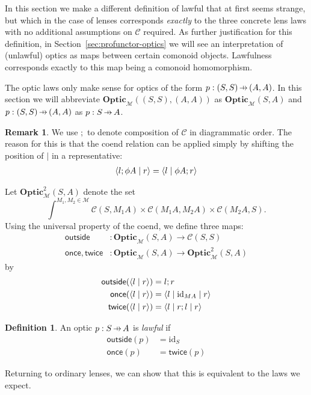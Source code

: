\documentclass[11pt,letterpaper]{article}
\theoremstyle{plain}
\theoremstyle{definition}
\newtheorem{definition}[theorem]{Definition}
\newtheorem{remark}[theorem]{Remark}
\newcommand{\C}{\mathscr{C}}
\newcommand{\M}{\mathscr{M}}
\newcommand{\Optic}{\mathbf{Optic}}
\newcommand{\Twoptic}{\mathbf{Optic}^2}
\newcommand{\id}{\mathrm{id}}
\newcommand{\rep}[2]{{\ensuremath \left\langle #1 \mid #2 \right\rangle}}
\newcommand{\repthree}[3]{{\ensuremath \langle #1 \mid #2 \mid #3 \rangle}}
\newcommand{\outside}{\mathsf{outside}}
\newcommand{\once}{\mathsf{once}}
\newcommand{\twice}{\mathsf{twice}}
\newcommand{\hto}{\ensuremath{\,\mathaccent\shortmid\rightarrow\,}}
\newcommand{\todo}[1]{\textcolor{red}{\small #1}}
\begin{document}
In this section we make a different definition of lawful that at first seems strange, but which in the case of lenses corresponds \emph{exactly} to the three concrete lens laws with no additional assumptions on $\C$ required. As further justification for this definition, in Section~\ref{sec:profunctor-optics} we will see an interpretation of (unlawful) optics as maps between certain comonoid objects. Lawfulness corresponds exactly to this map being a comonoid homomorphism.

The optic laws only make sense for optics of the form $p : (S,S) \hto (A, A)$. In this section we will abbreviate $\Optic_\M((S, S), (A, A))$ as $\Optic_\M(S, A)$ and $p : (S, S) \hto (A, A)$ as $p : S \hto A$.

\begin{remark}
We use $;$ to denote composition of $\C$ in diagrammatic order. The reason for this is that the coend relation can be applied simply by shifting the position of $\mid$ in a representative:
\begin{align*}
\rep{l;\phi A}{r} = \rep{l}{\phi A;r}
\end{align*}
\end{remark}

Let $\Twoptic_\M(S, A)$ denote the set \[ \int^{M_1, M_2 \in \M} \C(S, M_1 A) \times \C(M_1 A, M_2 A) \times \C(M_2 A, S). \]
Using the universal property of the coend, we define three maps:
\begin{align*}
  \outside &: \Optic_\M(S, A) \to \C(S, S) \\
  \once, \twice &: \Optic_\M(S, A) \to \Twoptic_\M(S, A)
\end{align*}
by
\begin{align*}
  \outside(\rep{l}{r}) &= l;r \\
  \once(\rep{l}{r}) &= \repthree{l}{\id_{MA}}{r} \\
  \twice(\rep{l}{r}) &= \repthree{l}{r;l}{r}
\end{align*}

\begin{definition}
  An optic $p : S \hto A$ is \emph{lawful} if
  \begin{align*}
    \outside(p) &= \id_S \\
    \once(p) &= \twice(p)
  \end{align*}
\end{definition}

Returning to ordinary lenses, we can show that this is equivalent to the laws we expect.
\end{document}
